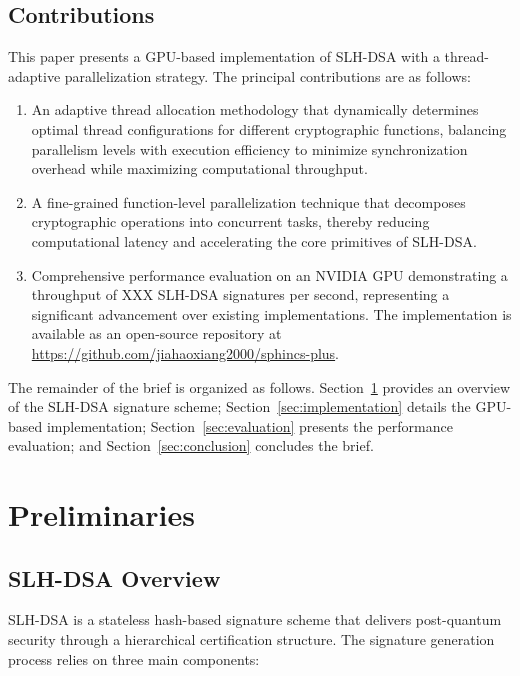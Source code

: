 \documentclass[journal]{IEEEtran}
\begin{document}
\subsection{Contributions}


This paper presents a GPU-based implementation of SLH-DSA with a thread-adaptive parallelization strategy. The principal contributions are as follows:

\begin{enumerate}
  \item An adaptive thread allocation methodology that dynamically determines optimal thread configurations for different cryptographic functions, balancing parallelism levels with execution efficiency to minimize synchronization overhead while maximizing computational throughput.

  \item A fine-grained function-level parallelization technique that decomposes cryptographic operations into concurrent tasks, thereby reducing computational latency and accelerating the core primitives of SLH-DSA.

  \item Comprehensive performance evaluation on an NVIDIA GPU demonstrating a throughput of XXX SLH-DSA signatures per second, representing a significant advancement over existing implementations. The implementation is available as an open-source repository at \url{https://github.com/jiahaoxiang2000/sphincs-plus}.
\end{enumerate}

The remainder of the brief is organized as follows. Section~\ref{sec:preliminaries} provides an overview of the SLH-DSA signature scheme; Section~\ref{sec:implementation} details the GPU-based implementation; Section~\ref{sec:evaluation} presents the performance evaluation; and Section~\ref{sec:conclusion} concludes the brief.

\section{Preliminaries}\label{sec:preliminaries}

\subsection{SLH-DSA Overview}

SLH-DSA is a stateless hash-based signature scheme that delivers post-quantum security through a hierarchical certification structure. The signature generation process relies on three main components:
\end{document}
